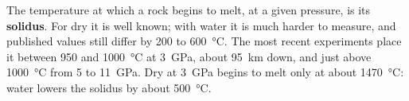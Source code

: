 The temperature at which a rock begins to melt, at a given pressure, is its
\textbf{solidus}. For dry  it is well known; with water it is
much harder to measure, and published values still differ by 200 to
\qty{600}{\celsius}. The most recent experiments place it between 950 and
\qty{1000}{\celsius} at \qty{3}{GPa}, about \qty{95}{km} down, and just above
\qty{1000}{\celsius} from 5 to \qty{11}{GPa}. Dry  at \qty{3}{GPa}
begins to melt only at about \qty{1470}{\celsius}: water lowers the solidus
by about \qty{500}{\celsius}.

